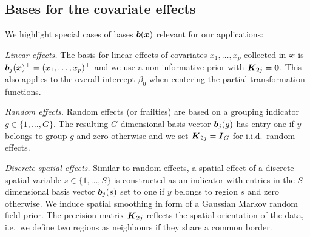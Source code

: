 \documentclass[12pt]{article}
\theoremstyle{plain}
\begin{document}
\subsection{Bases for the covariate effects}\label{sec:special_cases}

We highlight special cases of bases  $\text{\boldmath$b$}(\text{\boldmath$x$})$ relevant for our applications:
\begin{compactitem}
\item \textit{Linear effects.} The basis for linear effects of covariates $x_1, \ldots, x_p$ collected in $\text{\boldmath$x$}$ is $\text{\boldmath$b$}_j(\text{\boldmath$x$})^\top=(x_1, \ldots, x_p)^\top$ and we use a non-informative prior with $\text{\boldmath$K$}_{2j} = \bm{0}$. This also applies to the overall intercept $\beta_0$ when centering the partial transformation functions.
\item \textit{Random effects.} Random effects (or frailties) are based on a grouping indicator $g \in \{1, \ldots, G\}$. The resulting $G$-dimensional basis vector $\text{\boldmath$b$}_{j}(g)$ has entry one if $y$ belongs to group $g$ and zero otherwise and we set $\text{\boldmath$K$}_{2j} = \text{\boldmath$I$}_G$ for i.i.d.\ random effects.
\item \textit{Discrete spatial effects.} Similar to random effects, a spatial effect of a discrete spatial variable $s \in \{1, \ldots, S\}$ is constructed as an indicator  with entries in the $S$-dimensional basis vector
$\text{\boldmath$b$}_{j}(s)$ set to one if $y$ belongs to region $s$ and zero otherwise. We induce  spatial smoothing in form of a Gaussian Markov random field  \citep[GMRF][]{rue2005gaussian} prior. The  precision matrix $\text{\boldmath$K$}_{2j}$ reflects the spatial orientation of the data, i.e.~we define two regions as neighbours if they share a common border.
\end{compactitem}
\end{document}
